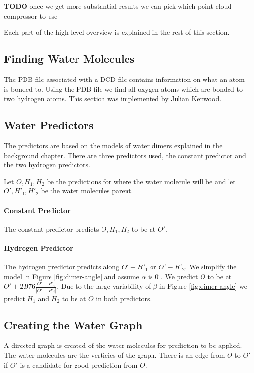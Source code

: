 \documentclass{report}
\newcommand{\degree}{\ensuremath{^\circ}}
\newcommand{\todo}{\textbf{TODO} }
\begin{document}
\todo once we get more substantial results we can pick which point cloud compressor to use

Each part of the high level overview is explained in the rest of this section.


\subsection{Finding Water Molecules}

The PDB file associated with a DCD file contains information on what an atom
is bonded to. Using the PDB file we find all oxygen atoms which are bonded to
two hydrogen atoms. This section was implemented by Julian Kenwood.


\subsection{Water Predictors}

The predictors are based on the models of water dimers explained in the
background chapter. There are three predictors used, the constant predictor
and the two hydrogen predictors.

Let $O, H_1, H_2$ be the predictions for where the water molecule will be and
let $O', H'_1, H'_2$ be the water molecules parent.

\paragraph{Constant Predictor}
The constant predictor predicts $O, H_1, H_2$ to be at $O'$.

\paragraph{Hydrogen Predictor}
The hydrogen predictor predicts along $O'-H'_1$ or $O'-H'_2$. We simplify the
model in Figure \ref{fig:dimer-angle} and assume $\alpha$ is $0\degree$. We
predict $O$ to be at $O' + 2.976\frac{O'-H'_i}{|O'-H'_i|}$. Due to the large
variability of $\beta$ in Figure \ref{fig:dimer-angle} we predict $H_1$ and
$H_2$ to be at $O$ in both predictors.


\subsection{Creating the Water Graph}

A directed graph is created of the water molecules for prediction to be
applied. The water molecules are the verticies of the graph. There is an edge
from $O$ to $O'$ if $O'$ is a candidate for good prediction from $O$.
\end{document}
